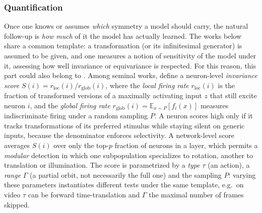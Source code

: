 \documentclass[mathematics,review,submit,moreauthors]{Definitions/mdpi}
\begin{document}
\subsubsection{Quantification}\label{sec:sym-quantification}
Once one knows or assumes \emph{which} symmetry a model should carry, the natural follow-up is \emph{how much} of it the model has actually learned.
The works below share a common template: a transformation (or its infinitesimal generator) is assumed to be given, and one measures a notion of sensitivity of the model under it, assessing how well invariance or equivariance is respected.
For this reason, this part could also belong to .\newline
Among seminal works, \citet{goodfellow2009anips} define a neuron-level \emph{invariance score} $S(i) = r_{\mathrm{loc}}(i)/r_{\mathrm{glob}}(i)$, where the \emph{local firing rate} $r_{\mathrm{loc}}(i)$ is the fraction of transformed versions of a maximally activating input $z$ that still excite neuron $i$, and the \emph{global firing rate} $r_{\mathrm{glob}}(i) = \mathbb{E}_{x\sim P}[f_i(x)]$ measures indiscriminate firing under a random sampling $P$.
A neuron scores high only if it tracks transformations of its preferred stimulus while staying silent on generic inputs, because the denominator enforces selectivity.
A network-level score averages $S(i)$ over only the top-$p$ fraction of neurons in a layer, which permits a \emph{modular} detection in which one subpopulation specializes to rotation, another to translation or illumination.
The score is parametrized by a \emph{type} $\tau$ (an action), a \emph{range} $\Gamma$ (a partial orbit, not necessarily the full one) and the sampling $P$: varying these parameters instantiates different tests under the same template, e.g.\ on video $\tau$ can be forward time-translation and $\Gamma$ the maximal number of frames skipped.
\end{document}
